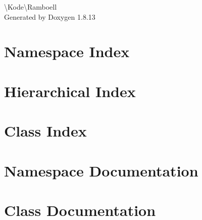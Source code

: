\documentclass[twoside]{book}
\newcommand{\+}{\discretionary{\mbox{\scriptsize$\hookleftarrow$}}{}{}}
\newcommand{\clearemptydoublepage}{%
  \newpage{\pagestyle{empty}\cleardoublepage}%
}
\begin{document}
\hypersetup{pageanchor=false,
             bookmarksnumbered=true,
             pdfencoding=unicode
            }
\begin{titlepage}
\vspace*{7cm}
\begin{center}%
{\Large \textbackslash{}Kode\textbackslash{}Ramboell }\\
\vspace*{1cm}
{\large Generated by Doxygen 1.8.13}\\
\end{center}
\end{titlepage}
\clearemptydoublepage
{}
\tableofcontents
\clearemptydoublepage
{}
\hypersetup{pageanchor=true}

\chapter{Namespace Index}

\chapter{Hierarchical Index}

\chapter{Class Index}

\chapter{Namespace Documentation}



\chapter{Class Documentation}






















\backmatter
\newpage
{}
\clearemptydoublepage
{}
\printindex
\end{document}
